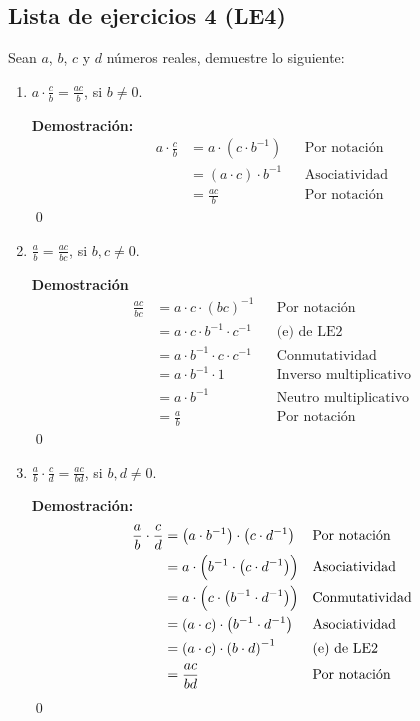 \documentclass[11pt]{article}
\begin{document}
\subsection*{Lista de ejercicios 4 (LE4)}

Sean $a$, $b$, $c$ y $d$ números reales, demuestre lo siguiente:

\begin{enumerate}[label=\alph*)]
    \item $a \cdot \frac{c}{b} = \frac{ac}{b}$, si $b \neq 0$.
    
    \textbf{Demostración:} \begin{align*}
        a \cdot \frac{c}{b} &= a \cdot \left( c \cdot b^{-1} \right) && \text{Por notación}\\
        &= \left( a \cdot c \right) \cdot b^{-1} && \text{Asociatividad}\\
        &= \frac{ac}{b} && \text{Por notación}
    \end{align*} \qed
    
    \item $\frac{a}{b} = \frac{ac}{bc}$, si $b,c \neq 0$.
    
    \textbf{Demostración}\begin{align*}
        \frac{ac}{bc} &= a \cdot c \cdot \left( bc \right)^{-1} && \text{Por notación}\\
        &= a \cdot c \cdot b^{-1} \cdot c^{-1} && \text{(e) de LE2}\\
        &= a \cdot b^{-1} \cdot c \cdot c^{-1} && \text{Conmutatividad}\\
        &= a \cdot b^{-1} \cdot 1 && \text{Inverso multiplicativo}\\
        &= a \cdot b^{-1} && \text{Neutro multiplicativo}\\
        &= \frac{a}{b} && \text{Por notación}
    \end{align*}\qed

    \item $\frac{a}{b} \cdot \frac{c}{d} = \frac{ac}{bd}$, si $b, d \neq 0$.
    
    \textbf{Demostración:}\begin{align*}
        \frac{a}{b} \cdot \frac{c}{d} &= \left( a \cdot b^{-1} \right) \cdot \left( c \cdot d^{-1} \right) && \text{Por notación}\\
            &= a \cdot \Bigl( b^{-1} \cdot \left( c \cdot d^{-1} \right) \Bigr) && \text{Asociatividad}\\
                &= a \cdot \Bigl( c \cdot \left( b^{-1} \cdot d^{-1} \right) \Bigr) && \text{Conmutatividad}\\
        &= \left( a \cdot c \right) \cdot \left( b^{-1} \cdot d^{-1} \right) && \text{Asociatividad}\\
        &= \left( a \cdot c \right) \cdot \left( b \cdot d \right)^{-1} && \text{(e) de LE2}\\
        &= \frac{ac}{bd} && \text{Por notación}
    \end{align*}\qed
    

\end{enumerate}
\end{document}
